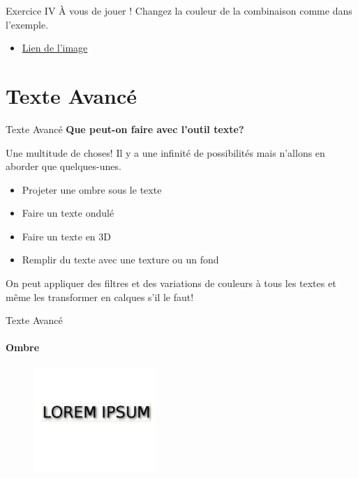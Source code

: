 \documentclass[10pt,svgnames,usenames,table]{beamer}
\begin{document}
	\begin{frame}{Exercice IV}
		À vous de jouer ! Changez la couleur de la combinaison comme dans l'exemple.
		\begin{itemize}
			\item \href{http://louvainlinux.github.io/atelier-gimp/src/Images/colours/col5.jpg}{Lien de l'image}
		\end{itemize}
	\end{frame}




\section{Texte Avancé}
	\begin{frame}{Texte Avancé}
		\textbf{Que peut-on faire avec l'outil texte?}		

		Une multitude de choses! Il y a une infinité de possibilités mais n'allons en aborder que quelques-unes.
		\begin{itemize}
			\item Projeter une ombre sous le texte
			\item Faire un texte ondulé
			\item Faire un texte en 3D
			\item Remplir du texte avec une texture ou un fond
		\end{itemize}
		
		On peut appliquer des filtres et des variations de couleurs à tous les textes et même les transformer en calques s'il le faut!
	\end{frame}


\begin{frame}{Texte Avancé}
		\framesubtitle{Ombre}
		\begin{figure}
		\centering
		\includegraphics[height=150px]{Images/text/ombre1}
		\end{figure}
\end{frame}
\end{document}
